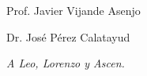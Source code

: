 \begin{minipage}[t]{0.4\textwidth}
    \centering
    {\large Prof. Javier Vijande Asenjo \par}
\end{minipage}
\hfill
\begin{minipage}[t]{0.4\textwidth}
    \centering
    {\large Dr. José Pérez Calatayud \par}
\end{minipage}
\raggedright


\newpage
\thispagestyle{empty}
\begin{flushright}
\end{flushright}

\newpage
\thispagestyle{empty}
\begin{flushright}
    \emph{A Leo, Lorenzo y Ascen.}
\end{flushright}


\newpage
\thispagestyle{empty}
\begin{flushright}
\end{flushright}


